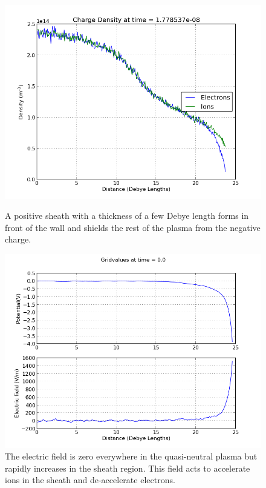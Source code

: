 \documentclass[12pt]{article}
\begin{document}
\begin{figure}    
\begin{minipage}[t]{0.45\textwidth}
\includegraphics[width=\linewidth]{sheath_dense.png}
\caption{A positive sheath with a thickness of a few Debye length forms in front of the wall and shields the rest of the plasma from the negative charge.}
\label{fig:sheath}
\end{minipage}
\hspace{\fill}
\begin{minipage}[t]{0.45\textwidth}
\includegraphics[width=\linewidth]{sheath_potential.png}
\caption{The electric field is zero everywhere in the quasi-neutral plasma but rapidly increases in the sheath region. This field acts to accelerate ions in the sheath and de-accelerate electrons.}
\label{fig:sheath_field}
\end{minipage}
\end{figure} 
\end{document}
